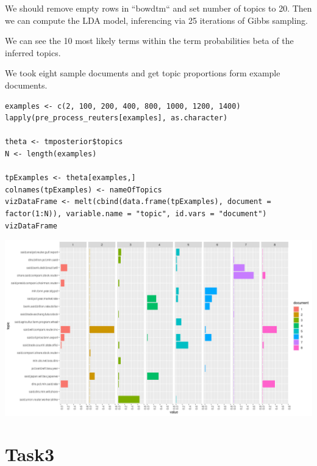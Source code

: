 \documentclass{article}
\begin{document}
We should remove empty rows in ``bowdtm`` and set number of topics to 20. Then we can compute the LDA model, inferencing via 25 iterations of Gibbs sampling.

We can see the 10 most likely terms within the term probabilities beta of the inferred topics.

We took eight sample documents and get topic proportions form example documents.

\begin{lstlisting}
examples <- c(2, 100, 200, 400, 800, 1000, 1200, 1400)
lapply(pre_process_reuters[examples], as.character)

theta <- tmposterior$topics
N <- length(examples)

tpExamples <- theta[examples,]
colnames(tpExamples) <- nameOfTopics
vizDataFrame <- melt(cbind(data.frame(tpExamples), document = factor(1:N)), variable.name = "topic", id.vars = "document")  
vizDataFrame
\end{lstlisting}

\includegraphics[width=.8\textwidth]{./task2.2.png}

\section{Task3}
\end{document}
